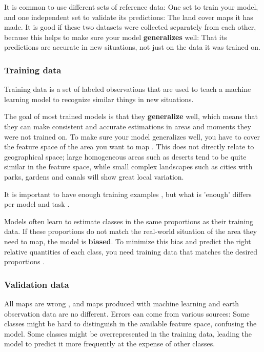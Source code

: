     It is common to use different sets of reference data: One set to train your model, and one independent set to validate its predictions: The land cover maps it has made. It is good if these two datasets were collected separately from each other, because this helps to make sure your model \textbf{generalizes} well: That its predictions are accurate in new situations, not just on the data it was trained on.

    \subsubsection*{Training data}

        Training data is a set of labeled observations that are used to teach a machine learning model to recognize similar things in new situations. 
        
        The goal of most trained models is that they \textbf{generalize} well, which means that they can make consistent and accurate estimations in areas and moments they were not trained on. To make sure your model generalizes well, you have to cover the feature space of the area you want to map \citep{meyer2021predicting}. This does not directly relate to geographical space; large homogeneous areas such as deserts tend to be quite similar in the feature space, while small complex landscapes such as cities with parks, gardens and canals will show great local variation. 

        It is important to have enough training examples \citep{ramezan2021effects,rodriguez-perez2017influence,zhu2016optimizing}, but what is 'enough' differs per model  \citep{myburgh2014impact} and task \citep{koshute2021recommending}.
        
        Models often learn to estimate classes in the same proportions as their training data. If these proportions do not match the real-world situation of the area they need to map, the model is \textbf{biased}. To minimize this bias and predict the right relative quantities of each class, you need training data that matches the desired proportions \citep{he2009learning, kleinewillinghofer2022unbiased}.
        
    \subsubsection*{Validation data}

        All maps are wrong \citep{monmonier2018how}, and maps produced with machine learning and earth observation data are no different. Errors can come from various sources: Some classes might be hard to distinguish in the available feature space, confusing the model. Some classes might be overrepresented in the training data, leading the model to predict it more frequently at the expense of other classes. 

